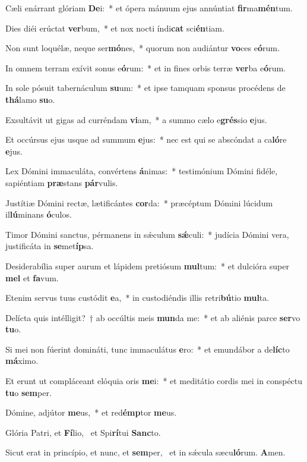 \item Cæli enárrant glóriam \textbf{De}i:~* et ópera mánuum ejus annúntiat \textbf{fir}ma\textbf{mén}tum.
\item Dies diéi erúctat \textbf{ver}bum,~* et nox nocti índi\textbf{cat} sci\textbf{én}tiam.
\item Non sunt loquélæ, neque ser\textbf{mó}nes,~* quorum non audiántur \textbf{vo}ces e\textbf{ó}rum.
\item In omnem terram exívit sonus e\textbf{ó}rum:~* et in fines orbis terræ \textbf{ver}ba e\textbf{ó}rum.
\item In sole pósuit tabernáculum \textbf{su}um:~* et ipse tamquam sponsus procédens de \textbf{thá}lamo \textbf{su}o.
\item Exsultávit ut gigas ad curréndam \textbf{vi}am,~* a summo cælo e\textbf{grés}sio \textbf{e}jus.
\item Et occúrsus ejus usque ad summum \textbf{e}jus:~* nec est qui se abscóndat a ca\textbf{ló}re \textbf{e}jus.
\item Lex Dómini immaculáta, convértens \textbf{á}nimas:~* testimónium Dómini fidéle, sapiéntiam \textbf{præ}stans \textbf{pár}vulis.
\item Justítiæ Dómini rectæ, lætificántes \textbf{cor}da:~* præcéptum Dómini lúcidum il\textbf{lú}minans \textbf{ó}culos.
\item Timor Dómini sanctus, pérmanens in sǽculum \textbf{sǽ}culi:~* judícia Dómini vera, justificáta in \textbf{se}met\textbf{íp}sa.
\item Desiderabília super aurum et lápidem pretiósum \textbf{mul}tum:~* et dulcióra super \textbf{mel} et \textbf{fa}vum.
\item Etenim servus tuus custódit \textbf{e}a,~* in custodiéndis illis retri\textbf{bú}tio \textbf{mul}ta.
\item Delícta quis intélligit?~† ab occúltis meis \textbf{mun}da me:~* et ab aliénis parce \textbf{ser}vo \textbf{tu}o.
\item Si mei non fúerint domináti, tunc immaculátus \textbf{e}ro:~* et emundábor a de\textbf{líc}to \textbf{má}ximo.
\item Et erunt ut compláceant elóquia oris \textbf{me}i:~* et meditátio cordis mei in conspéctu \textbf{tu}o \textbf{sem}per.
\item Dómine, adjútor \textbf{me}us,~* et red\textbf{émp}tor \textbf{me}us.
\item Glória Patri, et \textbf{Fí}lio,~\psstar{} et Spi\textbf{rí}tui \textbf{Sanc}to.
\item Sicut erat in princípio, et nunc, et \textbf{sem}per,~\psstar{} et in sǽcula sæcu\textbf{ló}rum. \textbf{A}men.
